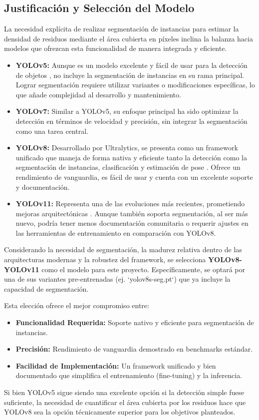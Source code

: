 \subsection{Justificación y Selección del Modelo}
\label{subsec:justificacion_yolo}

La necesidad explícita de realizar segmentación de instancias para estimar la densidad de residuos mediante el área cubierta en píxeles inclina la balanza hacia modelos que ofrezcan esta funcionalidad de manera integrada y eficiente.

\begin{itemize}
    \item \textbf{YOLOv5:} Aunque es un modelo excelente y fácil de usar para la detección de objetos \cite{jocher2020yolov5}, no incluye la segmentación de instancias en su rama principal. Lograr segmentación requiere utilizar variantes o modificaciones específicas, lo que añade complejidad al desarrollo y mantenimiento.

    \item \textbf{YOLOv7:} Similar a YOLOv5, su enfoque principal ha sido optimizar la detección en términos de velocidad y precisión, sin integrar la segmentación como una tarea central.

    \item \textbf{YOLOv8:} Desarrollado por Ultralytics, se presenta como un framework unificado que maneja de forma nativa y eficiente tanto la detección como la segmentación de instancias, clasificación y estimación de pose \cite{ultralyticsYOLOv8}. Ofrece un rendimiento de vanguardia, es fácil de usar y cuenta con un excelente soporte y documentación.

    \item \textbf{YOLOv11:} Representa una de las evoluciones más recientes, prometiendo mejoras arquitectónicas \cite{sapkota2025yolo}. Aunque también soporta segmentación, al ser más nuevo, podría tener menos documentación comunitaria o requerir ajustes en las herramientas de entrenamiento en comparación con YOLOv8.
\end{itemize}

Considerando la necesidad de segmentación, la madurez relativa dentro de las arquitecturas modernas y la robustez del framework, se selecciona \textbf{YOLOv8-YOLOv11} como el modelo para este proyecto. Específicamente, se optará por una de sus variantes pre-entrenadas (ej. `yolov8s-seg.pt`) que ya incluye la capacidad de segmentación.

Esta elección ofrece el mejor compromiso entre:
\begin{itemize}
    \item \textbf{Funcionalidad Requerida:} Soporte nativo y eficiente para segmentación de instancias.
    \item \textbf{Precisión:} Rendimiento de vanguardia demostrado en benchmarks estándar.
    \item \textbf{Facilidad de Implementación:} Un framework unificado y bien documentado que simplifica el entrenamiento (fine-tuning) y la inferencia.
\end{itemize}

Si bien YOLOv5 sigue siendo una excelente opción si la detección simple fuese suficiente, la necesidad de cuantificar el área cubierta por los residuos hace que YOLOv8 sea la opción técnicamente superior para los objetivos planteados.





